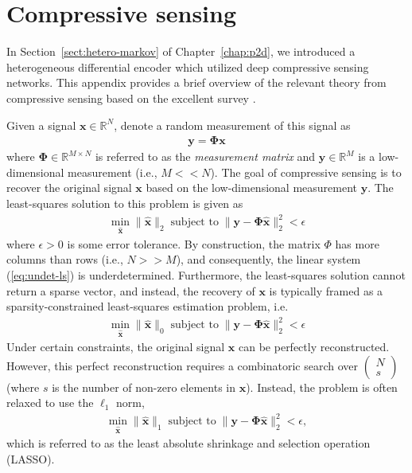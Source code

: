 \chapter{Compressive sensing}
\label{appdx:compressed-sensing}

In Section~\ref{sect:hetero-markov} of Chapter~\ref{chap:p2d}, we introduced a heterogeneous differential encoder which utilized deep compressive sensing networks. This appendix provides a brief overview of the relevant theory from compressive sensing based on the excellent survey \cite{ref:Marques2019ReviewOfSparseRecovery}.

Given a signal $\mathbf{x}\in\mathbb{R}^N$, denote a random measurement of this signal as 
\begin{align*}
    \mathbf{y} = \mathbf{\Phi}\mathbf{x}
\end{align*}
where $\mathbf{\Phi}\in\mathbb{R}^{M\times N}$ is referred to as the \emph{measurement matrix} and $\mathbf{y}\in\mathbb{R}^{M}$ is a low-dimensional measurement (i.e., $M << N$). The goal of compressive sensing is to recover the original signal $\mathbf{x}$ based on the low-dimensional measurement $\mathbf{y}$. The least-squares solution to this problem is given as
\begin{align}
    \min_{\hat{\mathbf{x}}}\|\hat{\mathbf{x}}\|_2 \; \text{subject to} \; \|\mathbf{y} - \mathbf{\Phi}\hat{\mathbf{x}}\|_2^2 < \epsilon \label{eq:undet-ls}
\end{align}
where $\epsilon > 0$ is some error tolerance. By construction, the matrix $\Phi$ has more columns than rows (i.e., $N >> M$), and consequently, the linear system (\ref{eq:undet-ls}) is underdetermined. Furthermore, the least-squares solution cannot return a sparse vector, and instead, the recovery of $\mathbf{x}$ is typically framed as a sparsity-constrained least-squares estimation problem, i.e.
\begin{align}
    \min_{\hat{\mathbf{x}}}\|\hat{\mathbf{x}}\|_0 \; \text{subject to} \; \|\mathbf{y} - \mathbf{\Phi}\hat{\mathbf{x}}\|_2^2 < \epsilon \label{eq:sparse-ls}
\end{align}
Under certain constraints, the original signal $\mathbf{x}$ can be perfectly reconstructed. However, this perfect reconstruction requires a combinatoric search over $\begin{pmatrix}N \\ s\end{pmatrix}$ (where $s$ is the number of non-zero elements in $\mathbf{x}$).
Instead, the problem is often relaxed to use the $\ell_1$ norm,
\begin{align}
    \min_{\hat{\mathbf{x}}}\|\hat{\mathbf{x}}\|_1 \; \text{subject to} \; \|\mathbf{y} - \mathbf{\Phi}\hat{\mathbf{x}}\|_2^2 < \epsilon, \label{eq:lasso-ls}
\end{align}
which is referred to as the least absolute shrinkage and selection operation (LASSO). 

